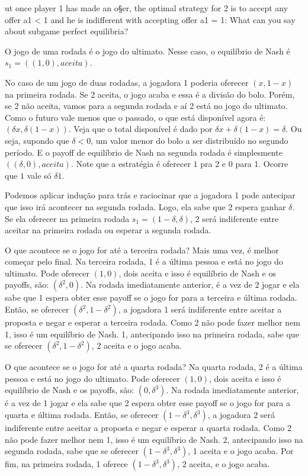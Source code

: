 \documentclass[
]{article}
\begin{document}
ut once player 1 has made an o§er, the optimal strategy for 2 is to
accept any offer a1 \textless{} 1 and he is indifferent with accepting
offer a1 = 1: What can you say about subgame perfect equilibria?

O jogo de uma rodada é o jogo do ultimato. Nesse caso, o equilíbrio de
Nash é \(s_1 = ((1, 0), aceita)\).

No caso de um jogo de duas rodadas, a jogadora 1 poderia oferecer
\((x, 1 - x)\) na primeira rodada. Se 2 aceita, o jogo acaba e essa é a
divisão do bolo. Porém, se 2 não aceita, vamos para a segunda rodada e
aí 2 está no jogo do ultimato. Como o futuro vale menos que o passado, o
que está disponível agora é: \((\delta x, \delta (1-x))\). Veja que o
total disponível é dado por \(\delta x + \delta (1-x) = \delta\). Ou
seja, supondo que \(\delta < 0\), um valor menor do bolo a ser
distribuído no segundo período. E o payoff de equilíbrio de Nash na
segunda rodada é simplesmente \(((\delta, 0), aceita)\). Note que a
estratégia é oferecer \(1\) pra 2 e 0 para 1. Ocorre que \(1\) vale só
\(\delta 1\).

Podemos aplicar indução para trás e raciocinar que a jogadora 1 pode
antecipar que isso irá acontecer na segunda rodada. Logo, ela sabe que 2
espera ganhar \(\delta\). Se ela oferecer na primeira rodada
\(s_1 = (1 - \delta , \delta)\), 2 será indiferente entre aceitar na
primeira rodada ou esperar a segunda rodada.

O que acontece se o jogo for até a terceira rodada? Mais uma vez, é
melhor começar pelo final. Na terceira rodada, 1 é a última pessoa e
está no jogo do ultimato. Pode oferecer \((1,0)\), dois aceita e isso é
equilíbrio de Nash e os payoffs, são: \((\delta^2,0)\). Na rodada
imediatamente anterior, é a vez de 2 jogar e ela sabe que 1 espera obter
esse payoff se o jogo for para a terceira e última rodada. Então, se
oferecer \((\delta^2, 1 - \delta^2)\), a jogadora 1 será indiferente
entre aceitar a proposta e negar e esperar a terceira rodada. Como 2 não
pode fazer melhor nem 1, isso é um equilíbrio de Nash. 1, antecipando
isso na primeira rodada, sabe que se oferecer
\((\delta^2, 1 - \delta^2)\), 2 aceita e o jogo acaba.

O que acontece se o jogo for até a quarta rodada? Na quarta rodada, 2 é
a última pessoa e está no jogo do ultimato. Pode oferecer \((1,0)\),
dois aceita e isso é equilíbrio de Nash e os payoffs, são:
\((0 , \delta^3)\). Na rodada imediatamente anterior, é a vez de 1 jogar
e ela sabe que 2 espera obter esse payoff se o jogo for para a quarta e
última rodada. Então, se oferecer \((1 - \delta^3, \delta^3)\), a
jogadora 2 será indiferente entre aceitar a proposta e negar e esperar a
quarta rodada. Como 2 não pode fazer melhor nem 1, isso é um equilíbrio
de Nash. 2, antecipando isso na segunda rodada, sabe que se oferecer
\((1 - \delta^3,\delta^3)\), 1 aceita e o jogo acaba. Por fim, na
primeira rodada, 1 oferece \((1 - \delta^3,\delta^3)\), 2 aceita, e o
jogo acaba.
\end{document}
